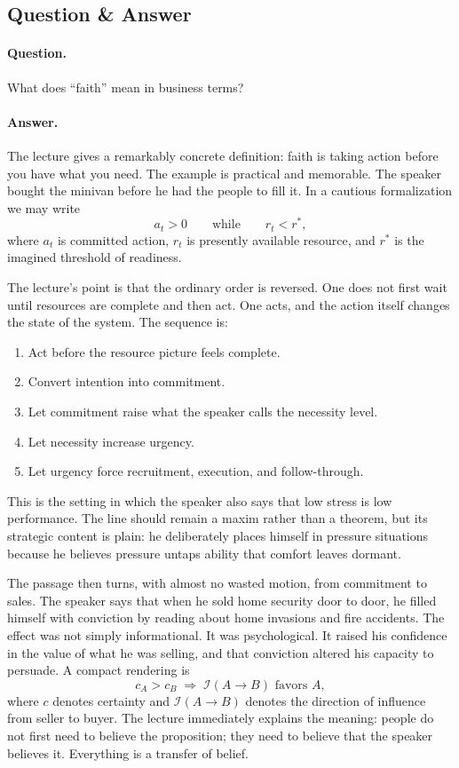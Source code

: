 \subsection{Question \& Answer}

\paragraph{Question.} What does ``faith'' mean in business terms?

\paragraph{Answer.} The lecture gives a remarkably concrete definition: faith is taking action before you have what you need. The example is practical and memorable. The speaker bought the minivan before he had the people to fill it. In a cautious formalization we may write
\begin{equation}
a_t > 0 \qquad \text{while} \qquad r_t < r^\ast,
\end{equation}
where \(a_t\) is committed action, \(r_t\) is presently available resource, and \(r^\ast\) is the imagined threshold of readiness.

The lecture's point is that the ordinary order is reversed. One does not first wait until resources are complete and then act. One acts, and the action itself changes the state of the system. The sequence is:
\begin{enumerate}
\item Act before the resource picture feels complete.
\item Convert intention into commitment.
\item Let commitment raise what the speaker calls the necessity level.
\item Let necessity increase urgency.
\item Let urgency force recruitment, execution, and follow-through.
\end{enumerate}
This is the setting in which the speaker also says that low stress is low performance. The line should remain a maxim rather than a theorem, but its strategic content is plain: he deliberately places himself in pressure situations because he believes pressure untaps ability that comfort leaves dormant.

The passage then turns, with almost no wasted motion, from commitment to sales. The speaker says that when he sold home security door to door, he filled himself with conviction by reading about home invasions and fire accidents. The effect was not simply informational. It was psychological. It raised his confidence in the value of what he was selling, and that conviction altered his capacity to persuade. A compact rendering is
\begin{equation}
c_A > c_B \;\Rightarrow\; \mathcal{I}(A\to B)\text{ favors }A,
\end{equation}
where \(c\) denotes certainty and \(\mathcal{I}(A\to B)\) denotes the direction of influence from seller to buyer. The lecture immediately explains the meaning: people do not first need to believe the proposition; they need to believe that the speaker believes it. Everything is a transfer of belief.

